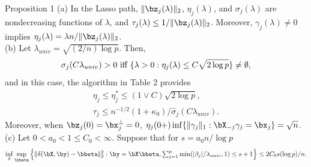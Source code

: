 \begin{frame}
\begin{block}{Proposition 1}
\scriptsize
(a) In the Lasso path, $\|\bz_j(\lambda)\|_2$, $\eta_j(\lambda)$, and $\sigma_j(\lambda)$
are nondecreasing functions of $\lambda$, and $\tau_j(\lambda)\le 1/\|\bz_j(\lambda)\|_2$. Moreover,
$\gamma_j(\lambda)\neq 0$ implies $\eta_j(\lambda)=\lambda n/\|\bz_j(\lambda)\|_2$. \\

(b) Let $\lambda_{univ}=\sqrt{(2/n)\log p}$. Then,
\begin{equation}
\sigma_j(C\lambda_{univ})>0 \hbox{ iff } \{\lambda>0: \eta_j(\lambda) \le C\sqrt{2\log p}\}\neq \emptyset,
\end{equation}
    and in this case, the algorithm in Table 2 provides
\begin{gather}
\eta_{j}\leq \eta_j^*\le (1\vee C)\sqrt{2\log p},\\
\tau_j\le n^{-1/2}(1+\kappa_0)/\hat{\sigma}_j(C\lambda_{univ}).
\end{gather}
    Moreover, when $\bz_j(0)=\bx_j^\perp =0$, $\eta_j(0+) \inf\{\|\gamma_j\|_1: \bX_{-j}\gamma_j=\bx_j\}=\sqrt{n}$.\\
(c) Let $0<a_0<1\leq C_0<\infty$. Suppose that for $s=a_0n/\log p$
\begin{equation*}
\inf_{\delta}\sup_{\bbeta}\Big\{\|\delta(\bX,\by) - \bbeta\|_2^2: \by=\bX\bbeta,
\hbox{$\sum_{j=1}^p$} \min(|\beta_j|/\lambda_{univ},1)\le s+1 \Big\}\le 2C_0s(\log p)/n.
\end{equation*}
\end{block}
\end{frame}


